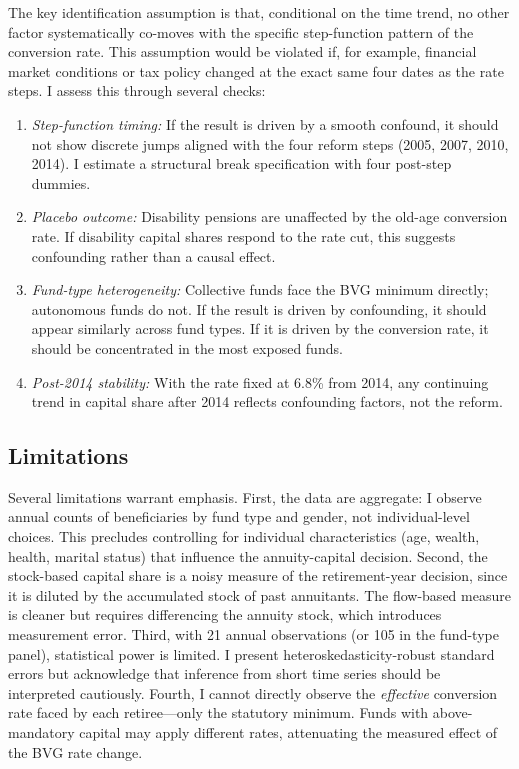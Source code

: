 \documentclass[12pt]{article}
\begin{document}
The key identification assumption is that, conditional on the time trend, no other factor systematically co-moves with the specific step-function pattern of the conversion rate. This assumption would be violated if, for example, financial market conditions or tax policy changed at the exact same four dates as the rate steps. I assess this through several checks:

\begin{enumerate}
\item \textit{Step-function timing:} If the result is driven by a smooth confound, it should not show discrete jumps aligned with the four reform steps (2005, 2007, 2010, 2014). I estimate a structural break specification with four post-step dummies.
\item \textit{Placebo outcome:} Disability pensions are unaffected by the old-age conversion rate. If disability capital shares respond to the rate cut, this suggests confounding rather than a causal effect.
\item \textit{Fund-type heterogeneity:} Collective funds face the BVG minimum directly; autonomous funds do not. If the result is driven by confounding, it should appear similarly across fund types. If it is driven by the conversion rate, it should be concentrated in the most exposed funds.
\item \textit{Post-2014 stability:} With the rate fixed at 6.8\% from 2014, any continuing trend in capital share after 2014 reflects confounding factors, not the reform.
\end{enumerate}

\subsection{Limitations}

Several limitations warrant emphasis. First, the data are aggregate: I observe annual counts of beneficiaries by fund type and gender, not individual-level choices. This precludes controlling for individual characteristics (age, wealth, health, marital status) that influence the annuity-capital decision. Second, the stock-based capital share is a noisy measure of the retirement-year decision, since it is diluted by the accumulated stock of past annuitants. The flow-based measure is cleaner but requires differencing the annuity stock, which introduces measurement error. Third, with 21 annual observations (or 105 in the fund-type panel), statistical power is limited. I present heteroskedasticity-robust standard errors but acknowledge that inference from short time series should be interpreted cautiously. Fourth, I cannot directly observe the \textit{effective} conversion rate faced by each retiree---only the statutory minimum. Funds with above-mandatory capital may apply different rates, attenuating the measured effect of the BVG rate change.
\end{document}
